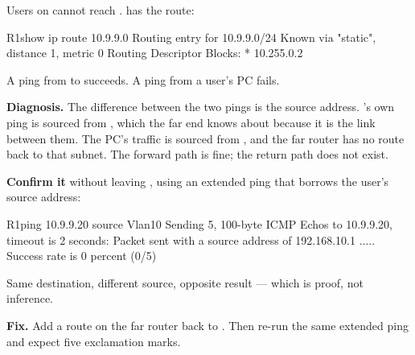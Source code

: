 \begin{breakfix}
Users on  cannot reach .  has the
route:

\begin{verify}{R1}{show ip route 10.9.9.0}
Routing entry for 10.9.9.0/24
  Known via "static", distance 1, metric 0
  Routing Descriptor Blocks:
  * 10.255.0.2
\end{verify}

A ping from  to  succeeds. A ping from a user's PC fails.

\textbf{Diagnosis.} The difference between the two pings is the source address.
's own ping is sourced from , which the far end knows
about because it is the link between them. The PC's traffic is sourced from
, and the far router has no route back to that subnet. The
forward path is fine; the return path does not exist.

\textbf{Confirm it} without leaving , using an extended ping that borrows
the user's source address:

\begin{verify}{R1}{ping 10.9.9.20 source Vlan10}
Sending 5, 100-byte ICMP Echos to 10.9.9.20, timeout is 2 seconds:
Packet sent with a source address of 192.168.10.1
.....
Success rate is 0 percent (0/5)
\end{verify}

Same destination, different source, opposite result --- which is proof, not
inference.

\textbf{Fix.} Add a route on the far router back to . Then
re-run the same extended ping and expect five exclamation marks.
\end{breakfix}

